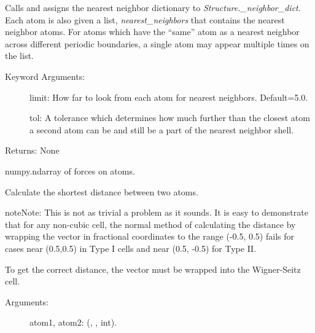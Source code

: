 \documentclass[letterpaper,10pt,english]{sphinxmanual}
\begin{document}
\begin{fulllineitems}
\begin{fulllineitems}
Calls  and assigns the nearest
neighbor dictionary to \emph{Structure.\_neighbor\_dict}. Each atom is also
given a list, \emph{nearest\_neighbors} that contains the nearest neighbor
atoms. For atoms which have the ``same'' atom as a nearest neighbor across
different periodic boundaries, a single atom may appear multiple times
on the list.
\begin{description}
\item[{Keyword Arguments:}] \leavevmode
limit: How far to look from each atom for nearest neighbors.
Default=5.0.

tol: A tolerance which determines how much further than the closest
atom a second atom can be and still be a part of the nearest
neighbor shell.

\end{description}

Returns: None

\end{fulllineitems}


\begin{fulllineitems}
\label{models:qmpy.Structure.forces}
numpy.ndarray of forces on atoms.

\end{fulllineitems}


\begin{fulllineitems}
\label{models:qmpy.Structure.get_distance}
Calculate the shortest distance between two atoms.

\begin{notice}{note}{Note:}
This is not as trivial a problem as it sounds. It is easy to
demonstrate that for any non-cubic cell, the normal method of
calculating the distance by wrapping the vector in fractional
coordinates to the range (-0.5, 0.5) fails for cases near (0.5,0.5)
in Type I cells and near (0.5, -0.5) for Type II.

To get the correct distance, the vector must be wrapped into the
Wigner-Seitz cell.
\end{notice}
\begin{description}
\item[{Arguments:}] \leavevmode
atom1, atom2: ({\hyperref[models:qmpy.Atom]{}}, {\hyperref[models:qmpy.Site]{}}, int).


\end{description}
\end{fulllineitems}
\end{fulllineitems}
\end{document}
